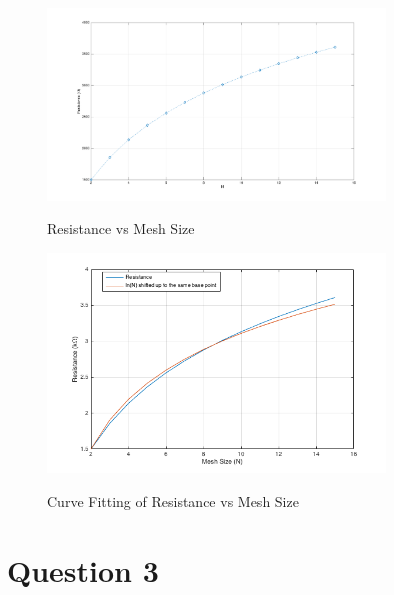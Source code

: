 \documentclass[11pt]{amsart}
\begin{document}
\begin{center}
	\begin{figure}[h]
		\caption{Resistance vs Mesh Size}
		\includegraphics[width=0.8\textwidth]{assets/n_vs_r_unopt.png}\label{fig:r_n_opt}
	\end{figure}
\end{center}

\begin{center}
	\begin{figure}[h]
		\caption{Curve Fitting of Resistance vs Mesh Size}
		\includegraphics[width=0.8\textwidth]{assets/fit_r.png}\label{fig:fit_r}
	\end{figure}
\end{center}
\pagebreak

\section*{Question 3}
\end{document}

